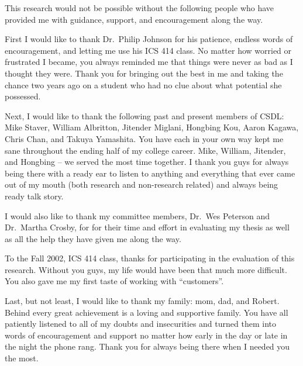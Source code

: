 
\begin{acknowledgments}
This research would not be possible without the following people who have
provided me with guidance, support, and encouragement along the way.

First I would like to thank Dr.~Philip Johnson for his patience, endless
words of encouragement, and letting me use his ICS 414 class.  No matter
how worried or frustrated I became, you always reminded me that things were
never as bad as I thought they were.  Thank you for bringing out the best
in me and taking the chance two years ago on a student who had no clue
about what potential she possessed.

Next, I would like to thank the following past and present members of CSDL:
Mike Staver, William Albritton, Jitender Miglani, Hongbing Kou, Aaron
Kagawa, Chris Chan, and Takuya Yamashita.  You have each in your own way
kept me sane throughout the ending half of my college career.  Mike,
William, Jitender, and Hongbing -- we served the most time together.  I
thank you guys for always being there with a ready ear to listen to
anything and everything that ever came out of my mouth (both research and
non-research related) and always being ready talk story.

I would also like to thank my committee members, Dr.~Wes Peterson and
Dr.~Martha Crosby, for for their time and effort in evaluating my thesis as
well as all the help they have given me along the way.

To the Fall 2002, ICS 414 class, thanks for participating in the evaluation
of this research.  Without you guys, my life would have been that much more
difficult.  You also gave me my first taste of working with ``customers''.

Last, but not least, I would like to thank my family: mom, dad, and Robert.
Behind every great achievement is a loving and supportive family.  You have
all patiently listened to all of my doubts and insecurities and turned them
into words of encouragement and support no matter how early in the day or
late in the night the phone rang.  Thank you for always being there when I
needed you the most.
\end{acknowledgments}
